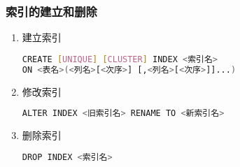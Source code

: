 \subsubsection{索引的建立和删除}
\begin{enumerate}
\item 建立索引
\begin{lstlisting}[language=bash]
CREATE [UNIQUE] [CLUSTER] INDEX <索引名>
ON <表名>(<列名>[<次序>] [,<列名>[<次序>]]...)
\end{lstlisting}
\item 修改索引
\begin{lstlisting}[language=bash]
ALTER INDEX <旧索引名> RENAME TO <新索引名>
\end{lstlisting}
\item  删除索引
\begin{lstlisting}[language=bash]
DROP INDEX <索引名>
\end{lstlisting}
\end{enumerate}


